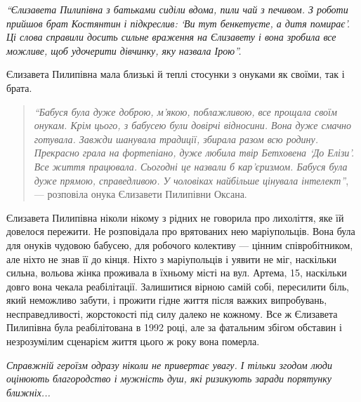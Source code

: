 \begin{leftbar}
\em\enquote{Єлизавета Пилипівна з батьками сиділи вдома, пили чай з печивом. З роботи
прийшов брат Костянтин і підкреслив: \enquote{Ви тут бенкетуєте, а дитя помирає}. Ці
слова справили досить сильне враження на Єлизавету і вона зробила все можливе,
щоб удочерити дівчинку, яку назвала Ірою}.
\end{leftbar}


Єлизавета Пилипівна мала близькі й теплі стосунки з онуками як своїми, так і
брата.

\begin{quote}
\emph{\enquote{Бабуся була дуже доброю, м'якою, поблажливою, все прощала своїм онукам. Крім
цього, з бабусею були довірчі відносини. Вона дуже смачно готувала. Завжди
шанувала традиції, збирала разом всю родину. Прекрасно грала на фортепіано,
дуже любила твір Бетховена \enquote{До Елізи}. Все життя працювала. Сьогодні це назвали
б кар'єризмом. Бабуся була дуже прямою, справедливою. У чоловіках найбільше
цінувала інтелект}}, — розповіла онука Єлизавети Пилипівни Оксана.
\end{quote}


Єлизавета Пилипівна ніколи нікому з рідних не говорила про лихоліття, яке їй
довелося пережити. Не розповідала про врятованих нею маріупольців. Вона була
для онуків чудовою бабусею, для робочого колективу — цінним співробітником, але
ніхто не знав її до кінця. Ніхто з маріупольців і уявити не міг, наскільки
сильна, вольова жінка проживала в їхньому місті на вул. Артема, 15, наскільки
довго вона чекала реабілітації. Залишитися вірною самій собі, пересилити біль,
який неможливо забути, і прожити гідне життя після важких випробувань,
несправедливості, жорстокості під силу далеко не кожному. Все ж Єлизавета
Пилипівна була реабілітована в 1992 році, але за фатальним збігом обставин і
незрозумілим сценарієм життя цього ж року вона померла.


\emph{Справжній героїзм одразу ніколи не привертає увагу. І тільки згодом люди
оцінюють благородство і мужність душ, які ризикують заради порятунку ближніх...}

